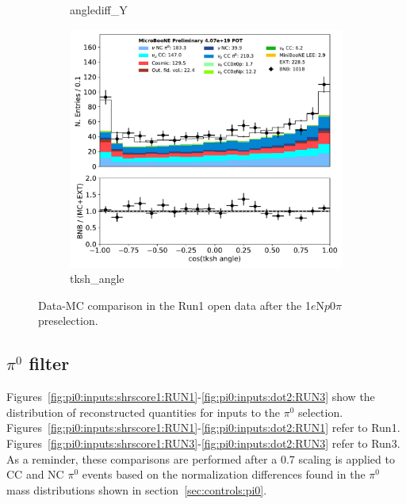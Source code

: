 \documentclass[a4paper]{article}
\newcommand{\npsel}{1$e$N$p$0$\pi$ }
\begin{document}
\begin{figure}[H]
\begin{center}
\begin{subfigure}[b]{0.3\textwidth}
    \caption{\label{fig:1eNp:dataMCRun1:anglediff_Y} anglediff\_Y }
    \end{subfigure}
    \begin{subfigure}[b]{0.3\textwidth}
    \centering
    \includegraphics[width=1.00\textwidth]{1eNp/dataMCRun1/tksh_angle01152020.pdf}
    \caption{\label{fig:1eNp:dataMCRun1:tksh_angle} tksh\_angle }
    \end{subfigure}
\caption{\label{fig:1eNp:dataMCRun1:pi02}Data-MC comparison in the Run1 open data after the \npsel preselection.}
\end{center}
\end{figure}

\subsection{$\pi^0$ filter}
\par Figures~\ref{fig:pi0:inputs:shrscore1:RUN1}-\ref{fig:pi0:inputs:dot2:RUN3} show the distribution of reconstructed quantities for inputs to the $\pi^0$ selection. Figures~\ref{fig:pi0:inputs:shrscore1:RUN1}-\ref{fig:pi0:inputs:dot2:RUN1} refer to Run1. Figures~\ref{fig:pi0:inputs:shrscore1:RUN3}-\ref{fig:pi0:inputs:dot2:RUN3} refer to Run3. As a reminder, these comparisons are performed after a 0.7 scaling is applied to CC and NC $\pi^0$ events based on the normalization differences found in the $\pi^0$ mass distributions shown in section~\ref{sec:controls:pi0}.
\end{document}
